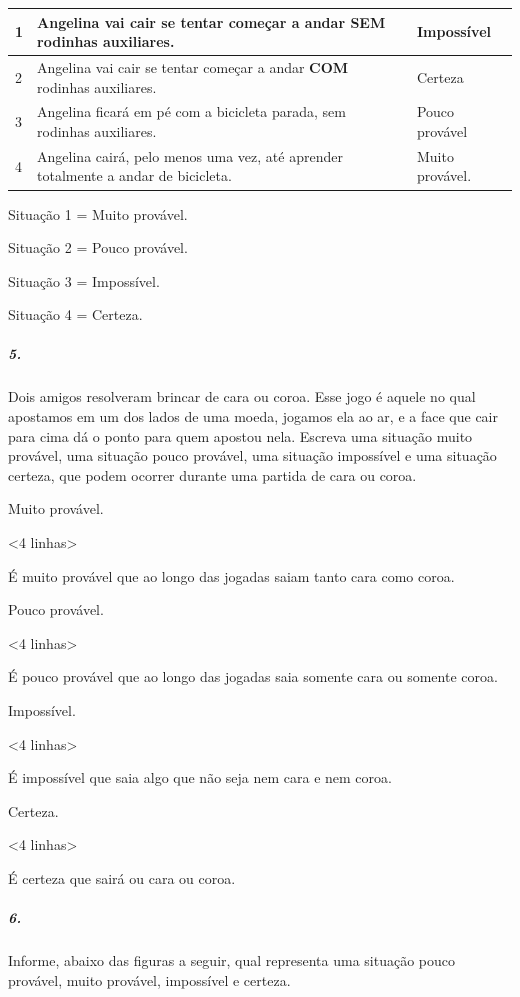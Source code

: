 \begin{longtable}[]{@{}llll@{}}
\toprule
1 & Angelina vai cair se tentar começar a andar \textbf{SEM} rodinhas
auxiliares. & & Impossível\tabularnewline
\midrule
\endhead
2 & Angelina vai cair se tentar começar a andar \textbf{COM} rodinhas
auxiliares. & & Certeza\tabularnewline
3 & Angelina ficará em pé com a bicicleta parada, sem rodinhas
auxiliares. & & Pouco provável\tabularnewline
4 & Angelina cairá, pelo menos uma vez, até aprender totalmente a andar
de bicicleta. & & Muito provável.\tabularnewline
\bottomrule
\end{longtable}

Situação 1 = Muito provável.

Situação 2 = Pouco provável.

Situação 3 = Impossível.

Situação 4 = Certeza.

\subparagraph{5. }\label{section-72}

Dois amigos resolveram brincar de cara ou coroa. Esse jogo é aquele no
qual apostamos em um dos lados de uma moeda, jogamos ela ao ar, e a face
que cair para cima dá o ponto para quem apostou nela. Escreva uma
situação muito provável, uma situação pouco provável, uma situação
impossível e uma situação certeza, que podem ocorrer durante uma partida
de cara ou coroa.

Muito provável.

\textless{}4 linhas\textgreater{}

É muito provável que ao longo das jogadas saiam tanto cara como coroa.

Pouco provável.

\textless{}4 linhas\textgreater{}

É pouco provável que ao longo das jogadas saia somente cara ou somente
coroa.

Impossível.

\textless{}4 linhas\textgreater{}

É impossível que saia algo que não seja nem cara e nem coroa.

Certeza.

\textless{}4 linhas\textgreater{}

É certeza que sairá ou cara ou coroa.

\subparagraph{6.}\label{section-73}

Informe, abaixo das figuras a seguir, qual representa uma situação pouco
provável, muito provável, impossível e certeza.

